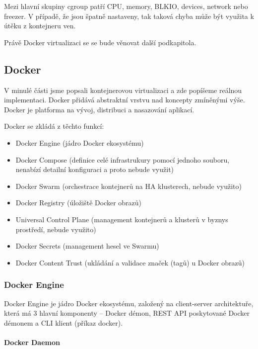 \documentclass[thesis=M,czech]{FITthesis}[2019/12/23]
\theoremstyle{plain}
\theoremstyle{definition}
\begin{document}
Mezi hlavní skupiny cgroup patří CPU, memory, BLKIO, devices, network nebo freezer. V případě, že jsou špatně nastaveny, tak taková chyba může být využita k útěku z kontejneru ven. 


Právě Docker virtualizaci se se bude věnovat další podkapitola.

\subsection{Docker}

V minulé části jsme popsali kontejnerovou virtualizaci a zde popíšeme reálnou implementaci. Docker přidává abstraktní vrstvu nad koncepty zmíněnými výše. Docker je platforma na vývoj, distribuci a nasazování aplikací. 

Docker se zkládá z těchto funkcí:


\begin{itemize}  
\item Docker Engine (jádro Docker ekosystému)
\item Docker Compose (definice celé infrastrukury pomocí jednoho souboru, nenabízí detailní konfiguraci a proto nebude využit)
\item Docker Swarm (orchestrace kontejnerů na HA klusterech, nebude využito)
\item Docker Registry (úložiště Docker obrazů)
\item Universal Control Plane (management kontejnerů a klusterů v byznys prostředí, nebude využito)
\item Docker Secrets (management hesel ve Swarmu)
\item Docker Content Trust (ukládání a validace značek (tagů) u Docker obrazů)

\end{itemize}


\subsubsection{Docker Engine}

Docker Engine je jádro Docker ekosystému, založený na client-server architektuře, která má 3 hlavní komponenty -- Docker démon, REST API poskytované Docker démonem a CLI klient (příkaz docker).




\paragraph{Docker Daemon}
\end{document}
